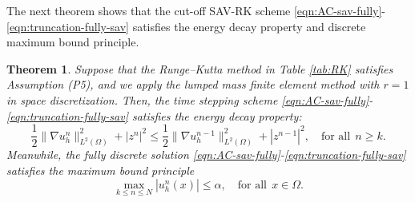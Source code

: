 \documentclass[a4paper, oneside]{book}
\def\II{(\Omega)}
\newtheorem{theorem}{Theorem}[section]
\begin{document}
The next theorem shows that the cut-off SAV-RK scheme \eqref{eqn:AC-sav-fully}-\eqref{eqn:truncation-fully-sav}
satisfies the energy decay property and discrete maximum bound principle.
\begin{theorem}\label{thm:energy-decay}
Suppose that the Runge--Kutta method in Table \ref{tab:RK} satisfies Assumption (P5),
and we apply the  lumped mass
finite element method with $r=1$ in space discretization.
Then, the time stepping scheme \eqref{eqn:AC-sav-fully}-\eqref{eqn:truncation-fully-sav} satisfies the energy decay property:
\begin{equation}\label{eqn:sav-energy}
\frac12\|  \nabla u_h^n \|_{L^2\II}^2 +  |z^{n}|^2 \le \frac12\|  \nabla u_h^{n-1} \|_{L^2\II}^2 +  |z^{n-1}|^2,\quad \text{for all}~~ n\ge k.
\end{equation}
Meanwhile,  the fully discrete solution \eqref{eqn:AC-sav-fully}-\eqref{eqn:truncation-fully-sav} satisfies the maximum bound principle
\begin{equation}\label{eqn:sav-max}
 \max_{k \le n\le N} | u_h^n (x) | \le \alpha, \quad \text{for all}~~ x\in \Omega.
 \end{equation}
\end{theorem}
\end{document}
